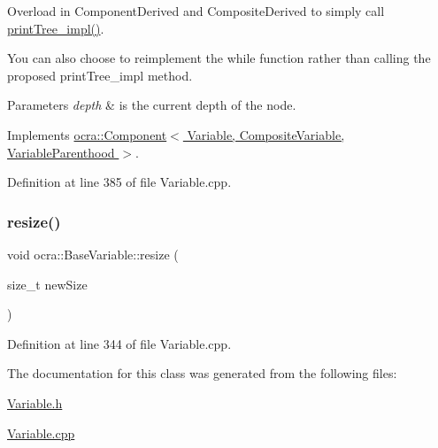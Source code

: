 Overload in Component\+Derived and Composite\+Derived to simply call \hyperlink{classocra_1_1Leaf_aaf46f5b8cd9d9667b8080898b1d9138a}{print\+Tree\+\_\+impl()}. 

You can also choose to reimplement the while function rather than calling the proposed print\+Tree\+\_\+impl method. 
\begin{DoxyParams}{Parameters}
{\em depth} & is the current depth of the node. \\
\hline
\end{DoxyParams}


Implements \hyperlink{classocra_1_1Component_a3687a02c1524694fc616893264ca8199}{ocra\+::\+Component$<$ Variable, Composite\+Variable, Variable\+Parenthood $>$}.



Definition at line 385 of file Variable.\+cpp.

\hypertarget{classocra_1_1BaseVariable_a5d473eeb113e4751c27cf6af7af62919}{}\label{classocra_1_1BaseVariable_a5d473eeb113e4751c27cf6af7af62919} 
\subsubsection{\texorpdfstring{resize()}{resize()}}
{\footnotesize\ttfamily void ocra\+::\+Base\+Variable\+::resize (\begin{DoxyParamCaption}\item[{size\+\_\+t}]{new\+Size }\end{DoxyParamCaption})}



Definition at line 344 of file Variable.\+cpp.



The documentation for this class was generated from the following files\+:\begin{DoxyCompactItemize}
\item 
\hyperlink{Variable_8h}{Variable.\+h}\item 
\hyperlink{Variable_8cpp}{Variable.\+cpp}\end{DoxyCompactItemize}
